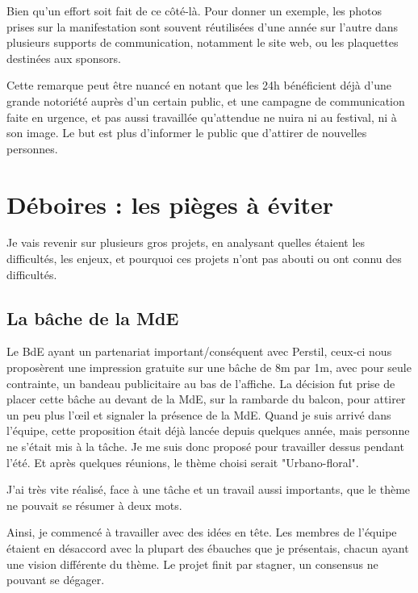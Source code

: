         Bien qu'un effort soit fait de ce côté-là. Pour donner un exemple, les photos prises sur la manifestation sont souvent réutilisées d'une année sur l'autre dans plusieurs supports de communication, notamment le site web, ou les plaquettes destinées aux sponsors.
        
        Cette remarque peut être nuancé en notant que les 24h bénéficient déjà d'une grande notoriété auprès d'un certain public, et une campagne de communication faite en urgence, et pas aussi travaillée qu'attendue ne nuira ni au festival, ni à son image. Le but est plus d'informer le public que d'attirer de nouvelles personnes.
    
\section{Déboires : les pièges à éviter}

    Je vais revenir sur plusieurs gros projets, en analysant quelles étaient les difficultés, les enjeux, et pourquoi ces projets n'ont pas abouti ou ont connu des difficultés.
    
    \subsection{La bâche de la MdE}
    
        Le BdE ayant un partenariat important/conséquent avec Perstil, ceux-ci nous proposèrent une impression gratuite sur une bâche de 8m par 1m, avec pour seule contrainte, un bandeau publicitaire au bas de l'affiche. 
        La décision fut prise de placer cette bâche au devant de la MdE, sur la rambarde du balcon, pour attirer un peu plus l'œil et signaler la présence de la MdE.
        Quand je suis arrivé dans l'équipe, cette proposition était déjà lancée depuis quelques année, mais personne ne s'était mis à la tâche.
        Je me suis donc proposé pour travailler dessus pendant l'été. Et après quelques réunions, le thème choisi serait "Urbano-floral".
        
        J'ai très vite réalisé, face à une tâche et un travail aussi importants, que le thème ne pouvait se résumer à deux mots.
        
        Ainsi, je commencé à travailler avec des idées en tête. Les membres de l'équipe étaient en désaccord avec la plupart des ébauches que je présentais, chacun ayant une vision différente du thème. Le projet finit par stagner, un consensus ne pouvant se dégager.
        
